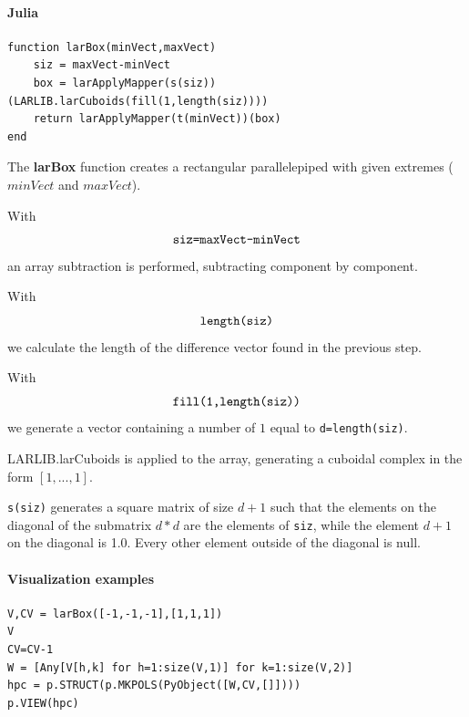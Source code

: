\documentclass{article}
\begin{document}
\paragraph{Julia}

\begin{verbatim}
function larBox(minVect,maxVect)
    siz = maxVect-minVect
    box = larApplyMapper(s(siz))(LARLIB.larCuboids(fill(1,length(siz))))
    return larApplyMapper(t(minVect))(box)
end 
\end{verbatim}

The \textbf{larBox} function creates a rectangular parallelepiped with given extremes ($minVect$ and $maxVect$).

With $$\verb!siz=maxVect-minVect!$$ an array subtraction is performed, subtracting component by component.

With $$\verb!length(siz)!$$ we calculate the length of the difference vector found in the previous step.

With $$\verb!fill(1,length(siz))!$$ we generate a vector containing a number of $1$ equal to \verb!d=length(siz)!.

LARLIB.larCuboids is applied to the array, generating a cuboidal complex in the form $[1,...,1]$.

\verb!s(siz)! generates a square matrix of size $d+1$ such that the elements on the diagonal of the submatrix $d*d$ are the elements of \verb!siz!, while the element $d+1$ on the diagonal is 1.0. Every other element outside of the diagonal is null.

\paragraph{Visualization examples}

\begin{verbatim}
V,CV = larBox([-1,-1,-1],[1,1,1])
V
CV=CV-1
W = [Any[V[h,k] for h=1:size(V,1)] for k=1:size(V,2)]
hpc = p.STRUCT(p.MKPOLS(PyObject([W,CV,[]])))
p.VIEW(hpc)
\end{verbatim}
\end{document}
